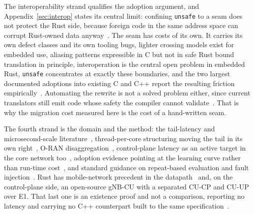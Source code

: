 \documentclass[english,oneside,a4paper,censored,csm,software-track-2020]{HYthesisML}
\begin{document}
\begin{appendices}
The interoperability strand qualifies the adoption argument, and Appendix~\ref{sec:interop}
states its central limit: confining \texttt{unsafe} to a seam does not protect the Rust side,
because foreign code in the same address space can corrupt Rust-owned data
anyway~\cite{rivera2021galeed,kirth2022pkrusafe}. The seam has costs of its own. It carries its
own defect classes and its own tooling bugs, lighter crossing models exist for embedded use,
aliasing patterns expressible in C but not in safe Rust bound translation in principle,
interoperation is the central open problem in embedded Rust, \texttt{unsafe} concentrates at
exactly these boundaries, and the two largest documented adoptions into existing C and C++ report
the resulting friction
empirically~\cite{li2022crosslang,cai2026interop,schuermann2023encapsulated,emre2023aliasing,sharma2024embedded,mccormack2026unsafe,li2026rustlinux,fan2026android}.
Automating the rewrite is not a solved problem either, since current translators still emit code
whose safety the compiler cannot validate~\cite{hong2025ctorust}. That is why the migration cost
measured here is the cost of a hand-written seam.

The fourth strand is the domain and the method: the tail-latency and microsecond-scale
literature~\cite{dean2013tail,barroso2017microseconds,li2014tales,huang2017predictability},
thread-per-core structuring moving the tail in its own right~\cite{enberg2019threadpercore},
O-RAN disaggregation~\cite{polese2023oran}, control-plane latency as an active target in the
core network too~\cite{liu2023l25gc,park2025ctrlbench}, adoption evidence pointing at the
learning curve rather than run-time
cost~\cite{fulton2021adopting,crichton2024learning,ardito2021verbosity}, and standard guidance on
repeat-based evaluation and fault injection~\cite{georges2007rigorous,natella2016fault}. Rust
has mobile-network precedent in the datapath~\cite{qazi2017pepc} and, on the control-plane
side, an open-source gNB-CU with a separated CU-CP and CU-UP over E1. That last one is an
existence proof and not a comparison, reporting no latency and carrying no C++ counterpart built
to the same specification~\cite{alsoran}.


\end{appendices}
\end{document}
